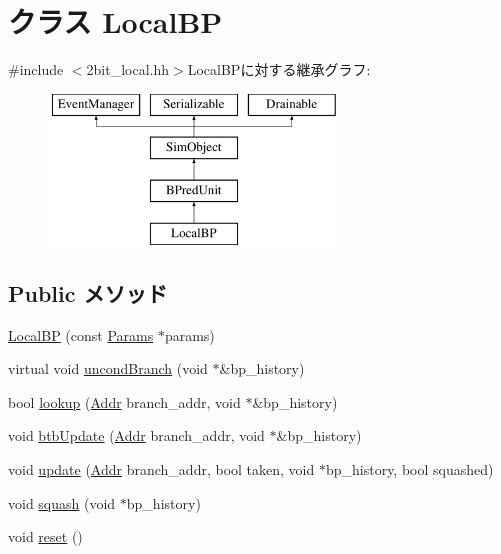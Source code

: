 \hypertarget{classLocalBP}{
\section{クラス LocalBP}
\label{classLocalBP}
}


{\ttfamily \#include $<$2bit\_\-local.hh$>$}LocalBPに対する継承グラフ:\begin{figure}[H]
\begin{center}
\leavevmode
\includegraphics[height=4cm]{classLocalBP}
\end{center}
\end{figure}
\subsection*{Public メソッド}
\begin{DoxyCompactItemize}
\item 
\hyperlink{classLocalBP_aec0c0965d267585d311300273d8976d0}{LocalBP} (const \hyperlink{classBPredUnit_aa715df0f49f029439cca4c7bd6e3d4fb}{Params} $\ast$params)
\item 
virtual void \hyperlink{classLocalBP_ad3d898a5eab93d923a1073fe6a0f0030}{uncondBranch} (void $\ast$\&bp\_\-history)
\item 
bool \hyperlink{classLocalBP_a9c30d728e49473b5a3825835e98a10bc}{lookup} (\hyperlink{base_2types_8hh_af1bb03d6a4ee096394a6749f0a169232}{Addr} branch\_\-addr, void $\ast$\&bp\_\-history)
\item 
void \hyperlink{classLocalBP_a101ada238eecd07cc6905c60272e2693}{btbUpdate} (\hyperlink{base_2types_8hh_af1bb03d6a4ee096394a6749f0a169232}{Addr} branch\_\-addr, void $\ast$\&bp\_\-history)
\item 
void \hyperlink{classLocalBP_a590e0fd17d5b663e25f0e956fadc7062}{update} (\hyperlink{base_2types_8hh_af1bb03d6a4ee096394a6749f0a169232}{Addr} branch\_\-addr, bool taken, void $\ast$bp\_\-history, bool squashed)
\item 
void \hyperlink{classLocalBP_aeb215cee5cdccdf52d02b73fffe80220}{squash} (void $\ast$bp\_\-history)
\item 
void \hyperlink{classLocalBP_ad20897c5c8bd47f5d4005989bead0e55}{reset} ()
\end{DoxyCompactItemize}
